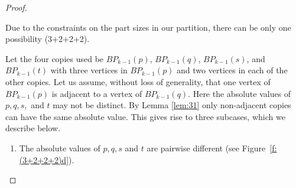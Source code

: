 \documentclass[final]{dmtcs-episciences}
\numberwithin{equation}{section}
\begin{document}
\begin{proof}
\begin{enumerate}
Due to the constraints on the part sizes in our partition, there can be only one possibility (3+2+2+2).

Let the four copies used be $BP_{k-1}(p)$, $BP_{k-1}(q)$, $BP_{k-1}(s)$, and $BP_{k-1}(t)$ with three vertices in $BP_{k-1}(p)$ and two vertices in each of the other copies. Let us assume, without loss of generality, that one vertex of $BP_{k-1}(p)$ is adjacent to a vertex of $BP_{k-1}(q)$. Here the absolute values of $p,q,s,$ and $t$ may not be distinct. By Lemma \ref{lem:31} only non-adjacent copies can have the same absolute value. This gives rise to three subcases, which we describe below.

\begin{enumerate}
    \item The absolute values of $p,q,s$ and $t$ are pairwise different (see Figure~\ref{f:(3+2+2+2)d}).
    


\end{enumerate}
\end{enumerate}
\end{proof}
\end{document}
